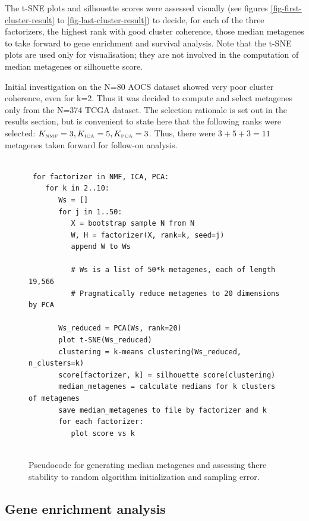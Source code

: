 \documentclass[draft, tikz, 12pt,a4paper,oneside,fleqn]{article}
\begin{document}
The t-SNE plots and silhouette scores were assessed visually (see figures \ref{fig-first-cluster-result} to \ref{fig-last-cluster-result}) to decide, for each of the three factorizers, the highest rank with good cluster coherence, those median metagenes to take forward to gene enrichment and survival analysis.   
Note that the t-SNE plots are used only for visualisation; they are not involved in the computation of median metagenes or silhouette score.

Initial investigation on the N=80 AOCS dataset showed very poor cluster coherence, even for k=2.   Thus it was decided to compute and select metagenes only from the N=374 TCGA dataset.   
The selection rationale is set out in the results section, but is convenient to state here that the following ranks were selected:
$K_{\mbox{\tiny NMF}} = 3, K_{\mbox{\tiny ICA}} = 5, K_{\mbox{\tiny PCA}} =3$.  Thus, there were $3 + 5 + 3 = 11$ metagenes taken forward for follow-on analysis.

\begin{figure}
\begin{center}
\begin{Verbatim}[baselinestretch=1, frame=single, rulecolor=\color{blue}, label=Metagene Stability Assessment, fontfamily=courier, fontsize=\small]

 for factorizer in NMF, ICA, PCA:
    for k in 2..10:
       Ws = []
       for j in 1..50:
          X = bootstrap sample N from N
          W, H = factorizer(X, rank=k, seed=j)
          append W to Ws
   	     
          # Ws is a list of 50*k metagenes, each of length 19,566
          # Pragmatically reduce metagenes to 20 dimensions by PCA
   	  
       Ws_reduced = PCA(Ws, rank=20)
       plot t-SNE(Ws_reduced)
       clustering = k-means clustering(Ws_reduced, n_clusters=k)
       score[factorizer, k] = silhouette score(clustering)	  
       median_metagenes = calculate medians for k clusters of metagenes
       save median_metagenes to file by factorizer and k
       for each factorizer:
          plot score vs k
      
\end{Verbatim}
\end{center}
\caption{Pseudocode for generating median metagenes and assessing there stability to random algorithm initialization and sampling error.}
\label{fig-clustering-psuedocode}
\end{figure}
	   	  
\subsection{Gene enrichment analysis}
\end{document}
